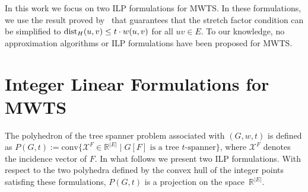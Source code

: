 \documentclass[12pt]{article}
\newcommand{\dist}{{\rm dist}}
\newcommand{\incid}{\mathcal{X}}
\newcommand{\espacoX}{\mathbb{R}^{|E|}}
\begin{document}
%
%
%
%
%
In this work we focus on two ILP formulations for MWTS.  In these
formulations, we use the result proved by~\cite{CaiC1995} that
guarantees that the stretch factor condition can be simplified to
$ \dist_{H}(u,v) \le t \cdot w(u,v)$ for all $uv\in E$.
%
To our knowledge, no approximation algorithms or ILP formulations have
been proposed for MWTS. 


\section{Integer Linear Formulations for MWTS}
The polyhedron of the tree spanner problem associated with
$(G,w,t)$ is defined as
$ P(G,t) := \text{conv}\{\incid^{F} \in \espacoX\; |\; \text{$G[F]$ is
  a tree $t$-spanner\}}$, where $\incid^{F}$ denotes the incidence
vector of $F$. In what follows we present two ILP formulations. With
respect to the two polyhedra defined by the convex hull of the integer
points satisfing these formulations, $P(G,t)$ is a projection on the
space~$\espacoX$. 
\end{document}
